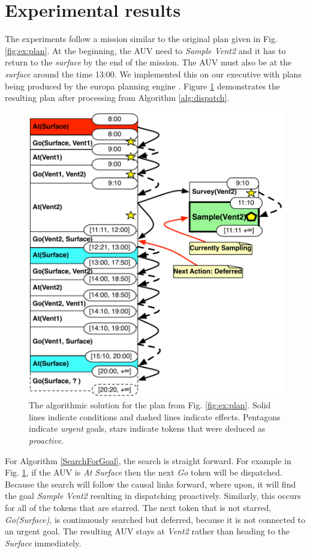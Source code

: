 \section{Experimental results}
\label{sec:exp}

The experiments follow a mission similar to the original plan given in
Fig. \ref{fig:ex:plan}. At the beginning, the AUV need to {\em Sample
  Vent2} and it has to return to the {\em surface} by the end of the
mission. The AUV must also be at the {\em surface} around the time 13:00. We
implemented this on our executive with plans being produced by the
europa planning engine \cite{frank2003}. Figure \ref{fig:ex:mixed1} 
demonstrates the resulting plan after processing from 
Algorithm \ref{alg:dispatch}.

\begin{figure}[!htbp]
  \centering
  \includegraphics[width=0.8\columnwidth]{figs/example_MixedInitial}
  \caption{\small The algorithmic solution for the plan from
    Fig. \ref{fig:ex:plan}. Solid lines indicate conditions and
    dashed lines indicate effects. Pentagons indicate {\em urgent}
    goals, stars indicate tokens that were deduced as {\em proactive}.}
  \label{fig:ex:mixed1}
\end{figure}

For Algorithm \ref{SearchForGoal}, the search is straight forward. For
example in Fig. \ref{fig:ex:mixed1}, if the AUV is {\em At Surface} then
the next {\em Go} token will be dispatched. Because the search will
follow the causal links forward, where upon, it will find the goal
{\em Sample Vent2} resulting in dispatching proactively.  Similarly,
this occurs for all of the tokens that are starred. The next token that is
not starred, {\em Go(Surface)}, is continuously searched but deferred,
because it is not connected to an urgent goal. The resulting AUV stays 
at {\em Vent2} rather than heading to the {\em Surface} immediately.

